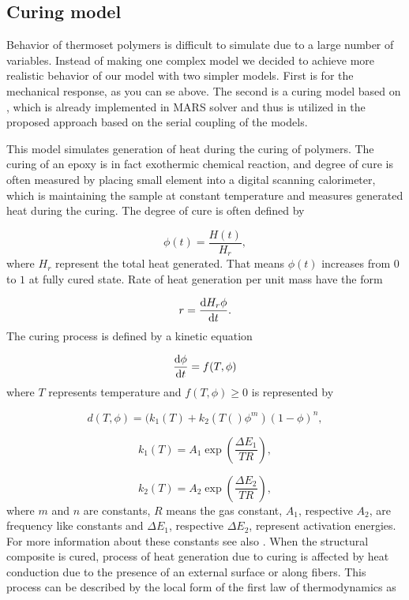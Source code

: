 \subsection{Curing model}
\indent

Behavior of thermoset polymers is difficult to simulate due to a large number of variables. Instead of making one complex model we decided to achieve more realistic behavior of our model with two simpler models. First is for the mechanical response, as you can se above. The second is a curing model based on \cite{heinrich2012generation}, which is already implemented in MARS solver \cite{mars} and thus is utilized in the proposed approach based on the serial coupling of the models. 

This model simulates generation of heat during the curing of polymers. The curing of an epoxy is in fact exothermic chemical reaction, and degree of cure is often measured by placing small element into a digital scanning calorimeter, which is maintaining the sample at constant temperature and measures generated heat during the curing. The degree of cure is often defined by

\begin{equation}
	\phi(t) = \dfrac{H(t)}{H_r},
\end{equation}
where $H_r$ represent the total heat generated. That means $\phi(t)$ increases from $0$ to $1$ at fully cured state. Rate of heat generation per unit mass have the form

\begin{equation}
	r = \dv{H_r\phi}{t}.
\end{equation}
The curing process is defined by a kinetic equation 

\begin{equation}\label{eq:curing_process}
	\dv{\phi}{t} = f(T,\phi)
\end{equation}
where $T$ represents temperature and $f(T,\phi)\geq 0$ is represented by 

\begin{equation}\label{eq:temperature_function}
	d(T,\phi) = (k_1(T)+k_2(T()\phi^m)(1-\phi)^n,
\end{equation}

\begin{equation}
	k_1(T) = A_1 \exp \left(\dfrac{\Delta E_1}{TR}\right),
\end{equation}

\begin{equation}
	k_2(T) = A_2 \exp \left( \dfrac{\Delta E_2}{TR}\right),
\end{equation}
where $m$ and $n$ are constants, $R$ means the gas constant, $A_1$, respective $A_2$, are frequency like constants and $\Delta E_1$, respective $\Delta E_2$, represent activation energies. For more information about these constants see also \cite{heinrich2012generation}.
When the structural composite is cured, process of heat generation due to curing is affected by heat conduction due to the presence of an external surface or along fibers. This process can be described by the local form of the first law of thermodynamics as

